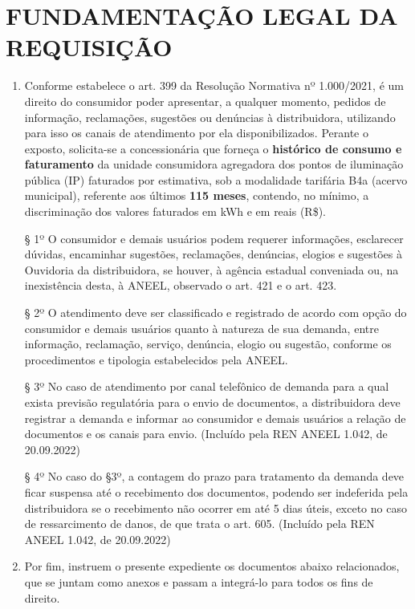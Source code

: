\newcommand{\tipoRequerimento}{Solicitação de Histórico de Consumo e Faturamento}

\section{FUNDAMENTAÇÃO LEGAL DA REQUISIÇÃO}

\begin{enumerate}[resume]
  \item Conforme estabelece o art. 399 da Resolução Normativa nº 1.000/2021, é um direito do consumidor poder apresentar, a qualquer momento, pedidos de informação, reclamações, sugestões ou denúncias à distribuidora, utilizando para isso os canais de atendimento por ela disponibilizados.
Perante o exposto, solicita-se a concessionária que forneça o \textbf{histórico de consumo e faturamento} da unidade consumidora agregadora dos pontos de iluminação pública (IP) faturados por estimativa, sob a modalidade tarifária B4a (acervo municipal), referente aos últimos \textbf{115 meses}, contendo, no mínimo, a discriminação dos valores faturados em kWh e em reais (R\$).

  § 1º O consumidor e demais usuários podem requerer informações, esclarecer dúvidas, encaminhar sugestões, reclamações, denúncias, elogios e sugestões à Ouvidoria da distribuidora, se houver, à agência estadual conveniada ou, na inexistência desta, à ANEEL, observado o art. 421 e o art. 423.

  § 2º O atendimento deve ser classificado e registrado de acordo com opção do consumidor e demais usuários quanto à natureza de sua demanda, entre informação, reclamação, serviço, denúncia, elogio ou sugestão, conforme os procedimentos e tipologia estabelecidos pela ANEEL.

  § 3º No caso de atendimento por canal telefônico de demanda para a qual exista previsão regulatória para o envio de documentos, a distribuidora deve registrar a demanda e informar ao consumidor e demais usuários a relação de documentos e os canais para envio. (Incluído pela REN ANEEL 1.042, de 20.09.2022)

  § 4º No caso do §3º, a contagem do prazo para tratamento da demanda deve ficar suspensa até o recebimento dos documentos, podendo ser indeferida pela distribuidora se o recebimento não ocorrer em até 5 dias úteis, exceto no caso de ressarcimento de danos, de que trata o art. 605. (Incluído pela REN ANEEL 1.042, de 20.09.2022)
  
  \item Por fim, instruem o presente expediente os documentos abaixo relacionados, que se juntam como anexos e passam a integrá-lo para todos os fins de direito.
\end{enumerate}

